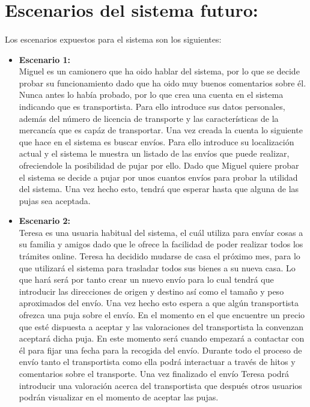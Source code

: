 \documentclass[10pt, a4paper,spanish]{article}
\begin{document}
		\paragraph{}


	\section{Escenarios del sistema futuro:}

		\paragraph{}
		Los escenarios expuestos para el sistema son los siguientes:

		\begin{itemize}
			\item \textbf{Escenario 1:} \\
				Miguel es un camionero que ha oido hablar del sistema, por lo que se decide probar su funcionamiento dado que ha oido muy buenos comentarios sobre él. Nunca antes lo había probado, por lo que crea una cuenta en el sistema indicando que es transportista. Para ello introduce sus datos personales, además del número de licencia de transporte y las características de la mercancía que es capáz de transportar. Una vez creada la cuenta lo siguiente que hace en el sistema es buscar envíos. Para ello introduce su localización actual y el sistema le muestra un listado de las envíos que puede realizar, ofreciendole la posibilidad de pujar por ello. Dado que Miguel quiere probar el sistema se decide a pujar por unos cuantos envíos para probar la utilidad del sistema. Una vez hecho esto, tendrá que esperar hasta que alguna de las pujas sea aceptada.

			\item \textbf{Escenario 2:} \\
				Teresa es una usuaria habitual del sistema, el cuál utiliza para envíar cosas a su familia y amigos dado que le ofrece la facilidad de poder realizar todos los trámites online. Teresa ha decidido mudarse de casa el próximo mes, para lo que utilizará el sistema para trasladar todos sus bienes a su nueva casa. Lo que hará será por tanto crear un nuevo envío para lo cual tendrá que introducir las direcciones de origen y destino así como el tamaño y peso aproximados del envío. Una vez hecho esto espera a que algún transportista ofrezca una puja sobre el envío. En el momento en el que encuentre un precio que esté dispuesta a aceptar y las valoraciones del transportista la convenzan aceptará dicha puja. En este momento será cuando empezará a contactar con él para fijar una fecha para la recogida del envío. Durante todo el proceso de envío tanto el transportista como ella podrá interactuar a través de hitos y comentarios sobre el transporte. Una vez finalizado el envío Teresa podrá introducir una valoración acerca del transportista que después otros usuarios podrán visualizar en el momento de aceptar las pujas.


\end{itemize}
\end{document}
